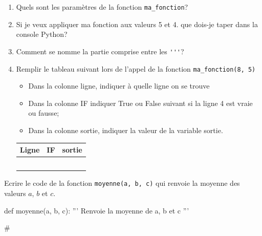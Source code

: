\documentclass[a4paper,10pt]{report}
\def\ptsexoB{2}
\begin{document}
\begin{enumerate}
    \item Quels sont les paramètres de la fonction \verb|ma_fonction|? \dotfill
    \item Si je veux appliquer ma fonction aux valeurs 5 et 4. que dois-je taper dans la console Python? \dotfill
    \item Comment se nomme la partie comprise entre les \verb|'''|? \dotfill
    \item Remplir le tableau suivant lors de l'appel de la fonction \verb|ma_fonction(8, 5)|
    
    \begin{minipage}{0.6\linewidth}
        \begin{itemize}
        \item Dans la colonne ligne, indiquer à quelle ligne on se trouve
        \item Dans la colonne IF indiquer True ou False suivant si la ligne 4 est vraie ou fausse;
        \item Dans la colonne sortie, indiquer la valeur de la variable sortie.
    \end{itemize}
    \end{minipage}
    \begin{minipage}{0.39\linewidth}
         \begin{tabular}{|p{1.5cm}|p{1cm}|p{1.5cm}|}
        \hline
    Ligne & IF & sortie \\ \hline 
    && \\ \hline       
    && \\ \hline       
    && \\ \hline       
    && \\ \hline       
    && \\ \hline       
    \end{tabular}
    \end{minipage}

    
   
\end{enumerate}


\bigskip

\exods{\ptsexoB}

Ecrire le code de la fonction \verb|moyenne(a, b, c)| qui renvoie la moyenne des valeurs $a$, $b$ et $c$.


\begin{CodePythontexAlt}[TaillePolice=\large,Largeur=1\linewidth,Centre,PremLigne=1]{}
def moyenne(a, b, c):
    ''' Renvoie la moyenne de a, b et c '''





    #
\end{CodePythontexAlt}
\end{document}
